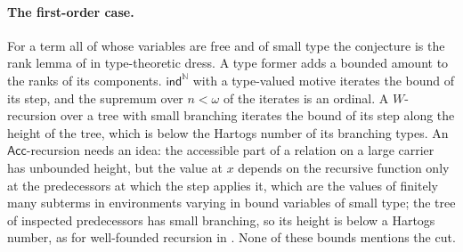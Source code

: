 \documentclass[10pt]{article}
\newcommand{\N}{\mathbb{N}}
\newcommand{\ind}{\mathsf{ind}}
\newcommand{\Acc}{\mathsf{Acc}}
\begin{document}
\paragraph{The first-order case.}
For a term all of whose variables are free and of small type the
conjecture is the rank lemma of \cite[\S3]{paper2} in type-theoretic
dress. A type former adds a bounded amount to the ranks of its
components. $\ind^\N$ with a type-valued motive iterates the bound of its
step, and the supremum over $n<\omega$ of the iterates is an ordinal. A
$W$-recursion over a tree with small branching iterates the bound of its
step along the height of the tree, which is below the Hartogs number of
its branching types. An $\Acc$-recursion needs an idea: the accessible
part of a relation on a large carrier has unbounded height, but the
value at $x$ depends on the recursive function only at the predecessors
at which the step applies it, which are the values of finitely many
subterms in environments varying in bound variables of small type; the
tree of inspected predecessors has small branching, so its height is
below a Hartogs number, as for well-founded recursion in \cite{paper2}.
None of these bounds mentions the cut.
\end{document}
